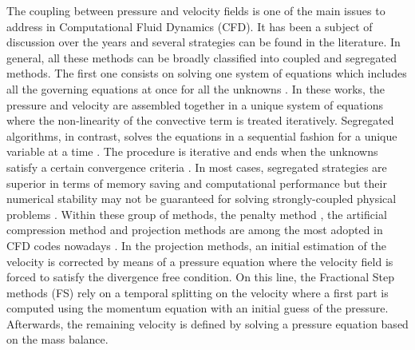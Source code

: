 \documentclass[final,3p,times,11pt,onecolumn]{myElsarticle}
\numberwithin{equation}{section}
\begin{document}
The coupling between pressure and velocity fields is one of the main issues to address in Computational Fluid Dynamics (CFD). It has been a subject of discussion over the years and several strategies can be found in the literature. In general, all these methods can be broadly classified into coupled and segregated methods. The first one consists on solving one system of equations which includes all the governing equations at once for all the unknowns \cite{mazhar1, mazhar2, chen, darwish1, darwish2, uroic}. In these works, the pressure and velocity are assembled together in a unique system of equations where the non-linearity of the convective term is treated iteratively. Segregated algorithms, in contrast, solves the equations in a sequential fashion for a unique variable at a time . The procedure is iterative and ends when the unknowns satisfy a certain convergence criteria \cite{ferziger, versteeg, moukalled}. In most cases, segregated strategies are superior in terms of memory saving and computational performance but their numerical stability may not be guaranteed for solving strongly-coupled physical problems \cite{wang, uroic}. Within these group of methods, the penalty method \cite{temam1968methode}, the artificial compression method \cite{harten1977artificial} and projection methods \cite{chorin1, chorin2, temam1968methode} are among the most adopted in CFD codes nowadays \cite{wang2}. In the projection methods, an initial estimation of the velocity is corrected by means of a pressure equation where the velocity field is forced to satisfy the divergence free condition. On this line, the Fractional Step methods (FS) \cite{kim} rely on a temporal splitting on the velocity where a first part is computed using the momentum equation with an initial guess of the pressure. Afterwards, the remaining velocity is defined by solving a pressure equation based on the mass balance.
\end{document}
